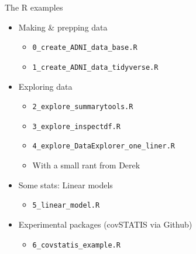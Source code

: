 \documentclass[
  ignorenonframetext,
]{beamer}
\providecommand{\tightlist}{%
  \setlength{\itemsep}{0pt}\setlength{\parskip}{0pt}}
\begin{document}
\begin{frame}[fragile]{The R examples}
\protect\hypertarget{the-r-examples}{}

\begin{itemize}
\tightlist
\item
  Making \& prepping data

  \begin{itemize}
  \tightlist
  \item
    \texttt{0\_create\_ADNI\_data\_base.R}
  \item
    \texttt{1\_create\_ADNI\_data\_tidyverse.R}
  \end{itemize}
\item
  Exploring data

  \begin{itemize}
  \tightlist
  \item
    \texttt{2\_explore\_summarytools.R}
  \item
    \texttt{3\_explore\_inspectdf.R}
  \item
    \texttt{4\_explore\_DataExplorer\_one\_liner.R}
  \item
    With a small rant from Derek
  \end{itemize}
\item
  Some stats: Linear models

  \begin{itemize}
  \tightlist
  \item
    \texttt{5\_linear\_model.R}
  \end{itemize}
\item
  Experimental packages (covSTATIS via Github)

  \begin{itemize}
  \tightlist
  \item
    \texttt{6\_covstatis\_example.R}
  \end{itemize}
\end{itemize}

\end{frame}
\end{document}
